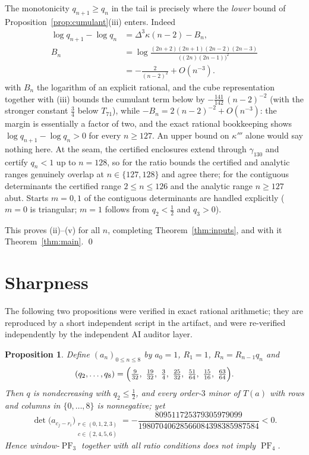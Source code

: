\documentclass[11pt]{amsart}
\newtheorem{proposition}[theorem]{Proposition}
\theoremstyle{definition}
\theoremstyle{remark}
\DeclareMathOperator{\PF}{PF}
\begin{document}
The monotonicity $q_{n+1}\ge q_n$ in the tail is precisely where the
\emph{lower} bound of Proposition~\ref{prop:cumulant}(iii) enters.
Indeed
\begin{align*}
\log q_{n+1}-\log q_n
  &=\Delta^{3}\kappa(n-2)-B_n,\\
B_n
  &=\log\frac{(2n+2)(2n+1)(2n-2)(2n-3)}
    {\bigl((2n)(2n-1)\bigr)^{2}}\\
  &=-\frac{2}{(n-2)^{2}}+O(n^{-3}).
\end{align*}
with $B_n$ the logarithm of an explicit rational, and the cube
representation together with (iii) bounds the cumulant term below by
$-\frac{141}{142}\,(n-2)^{-2}$ (with the stronger constant $\frac34$
below $T_{71}$), while $-B_n=2(n-2)^{-2}+O(n^{-3})$: the margin is
essentially a factor of two, and the exact rational bookkeeping shows
$\log q_{n+1}-\log q_n>0$ for every $n\ge 127$. An upper bound on
$\kappa'''$ alone would say nothing here. At the seam, the certified
enclosures extend through $\gamma_{130}$ and certify $q_n<1$ up to
$n=128$, so for the ratio bounds the certified and analytic ranges
genuinely overlap at $n\in\{127,128\}$ and agree there; for the
contiguous determinants the certified range $2\le n\le 126$ and the
analytic range $n\ge 127$ abut. Starts $m=0,1$ of the
contiguous determinants are handled explicitly ($m=0$ is triangular;
$m=1$ follows from $q_2<\tfrac12$ and $q_3>0$).

This proves (ii)--(v) for all $n$, completing
Theorem~\ref{thm:inputs}, and with it Theorem~\ref{thm:main}. \qed

\section{Sharpness}\label{sec:sharp}

The following two propositions were verified in exact rational
arithmetic; they are reproduced by a short independent script in the
artifact, and were re-verified independently by the independent AI auditor
layer.

\begin{proposition}\label{prop:cm1}
Define $(a_n)_{0\le n\le 8}$ by $a_0=1$, $R_1=1$, $R_n=R_{n-1}q_n$ and
\[
(q_2,\dots,q_8)=\Bigl(\tfrac{9}{32},\ \tfrac{19}{32},\ \tfrac34,\
\tfrac{25}{32},\ \tfrac{51}{64},\ \tfrac{15}{16},\ \tfrac{63}{64}\Bigr).
\]
Then $q$ is nondecreasing with $q_2\le\tfrac12$, and \emph{every}
order-$3$ minor of $T(a)$ with rows and columns in $\{0,\dots,8\}$ is
nonnegative; yet
\[
\det\bigl(a_{c_j-r_i}\bigr)_{\substack{r\in(0,1,2,3)\\ c\in(2,4,5,6)}}
=-\frac{809511725379305979099}{19807040628566084398385987584}<0 .
\]
Hence window-$\PF_3$ together with all ratio conditions does not imply
$\PF_4$.
\end{proposition}
\end{document}
